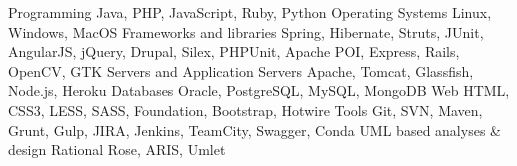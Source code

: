 

\begin{cvskills}

  \cvskill
    {Programming} %
    {Java, PHP, JavaScript, Ruby, Python} %
  \cvskill
    {Operating Systems} %
    {Linux, Windows, MacOS} %
  \cvskill
    {Frameworks and libraries} %
    {Spring, Hibernate, Struts, JUnit, AngularJS, jQuery, Drupal, Silex, PHPUnit, Apache POI, Express, Rails, OpenCV, GTK} %
  \cvskill
    {Servers and Application Servers} %
    {Apache, Tomcat, Glassfish, Node.js, Heroku} %
  \cvskill
    {Databases} %
    {Oracle, PostgreSQL, MySQL, MongoDB} %
  \cvskill
    {Web} %
    {HTML, CSS3, LESS, SASS, Foundation, Bootstrap, Hotwire} %
  \cvskill
    {Tools} %
    {Git, SVN, Maven, Grunt, Gulp, JIRA, Jenkins, TeamCity, Swagger, Conda} %
  \cvskill
    {UML based analyses \& design} %
    {Rational Rose, ARIS, Umlet} %

\end{cvskills}
